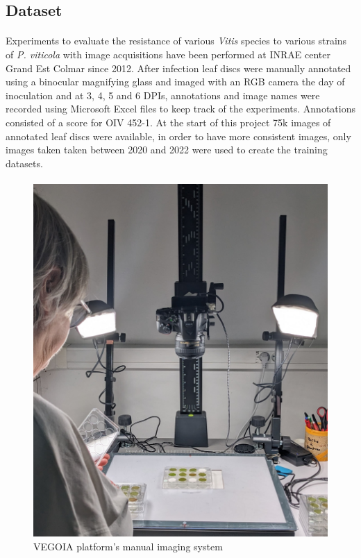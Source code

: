 \documentclass[english]{article}
\begin{document}
\subsection{Dataset}
\paragraph{}
Experiments to evaluate the resistance of various \textit{Vitis} species to various strains of \textit{P. viticola} with image acquisitions have been performed at INRAE center Grand Est Colmar since 2012. After infection leaf discs were manually annotated using a binocular magnifying glass and imaged with an RGB camera the day of inoculation and at 3, 4, 5 and 6 DPIs, annotations and image names were recorded using Microsoft Excel files to keep track of the experiments. Annotations consisted of a score for \cite{} OIV 452-1. At the start of this project 75k images of annotated leaf discs were available, in order to have more consistent images, only images taken taken between 2020 and 2022 were used to create the training datasets.
\paragraph{}




\begin{figure}[H]
    \begin{center}
        \includegraphics[width=0.5\linewidth]{2023_a_oiv_imaging_system.jpg}
        \caption{VEGOIA platform's manual imaging system}\label{fig:vegoia}
    \end{center}
\end{figure}
\end{document}
